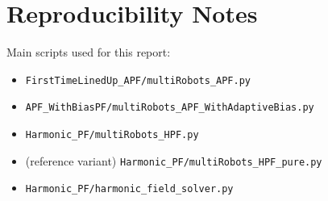 \documentclass[11pt,a4paper]{article}
\begin{document}
\section*{Reproducibility Notes}
Main scripts used for this report:
\begin{itemize}[leftmargin=1.2em]
    \item \texttt{FirstTimeLinedUp\_APF/multiRobots\_APF.py}
    \item \texttt{APF\_WithBiasPF/multiRobots\_APF\_WithAdaptiveBias.py}
    \item \texttt{Harmonic\_PF/multiRobots\_HPF.py}
    \item (reference variant) \texttt{Harmonic\_PF/multiRobots\_HPF\_pure.py}
    \item \texttt{Harmonic\_PF/harmonic\_field\_solver.py}
\end{itemize}
\end{document}
